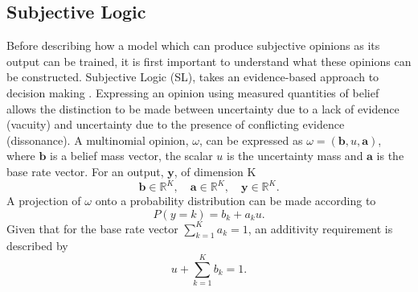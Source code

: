 \documentclass[
twocolumn,
]{ceurart}
\begin{document}
\subsection{Subjective Logic}
Before describing how a model which can produce subjective opinions as its output can be trained, it is first important to understand what these opinions can be constructed.
Subjective Logic (SL), takes an evidence-based approach to decision making \cite{Josang2016}.
Expressing an opinion using measured quantities of belief allows the distinction to be made between uncertainty due to a lack of evidence (vacuity) and uncertainty due to the presence of conflicting evidence (dissonance).
A multinomial opinion, $\omega$, can be expressed as $\omega=\left(\mathbf{b}, u, \mathbf{a}\right)$, where $\mathbf{b}$ is a belief mass vector, the scalar $u$ is the uncertainty mass and $\mathbf{a}$ is the base rate vector.
For an output, $\mathbf{y}$, of dimension K
\begin{equation}
    \mathbf{b}\in\mathbb{R}^K,\quad\mathbf{a}\in\mathbb{R}^K,\quad\mathbf{y}\in\mathbb{R}^K.
\end{equation}
A projection of $\omega$ onto a probability distribution can be made according to
\begin{equation}
    P(y=k) = b_k + a_ku.
\label{eq:prob_projection}
\end{equation}
Given that for the base rate vector $\sum_{k=1}^Ka_k=1$, an additivity requirement is described by
\begin{equation}
    u+\sum_{k=1}^K b_k=1.
\end{equation}
\end{document}
